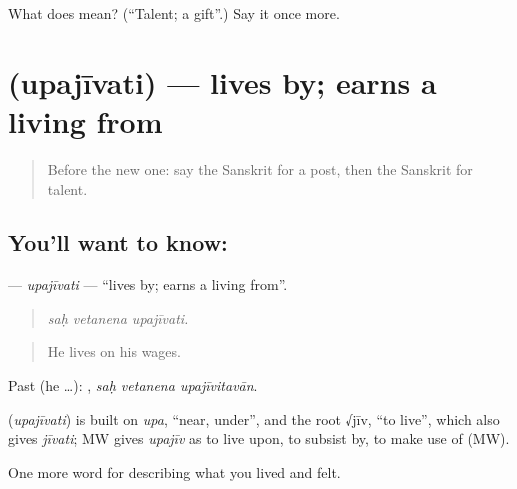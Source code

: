 \begin{tcolorbox}[breakable,colback=teal!4,colframe=teal!35!black,title={Before you move on}]
What does  mean? (\textquotedblleft{}Talent; a gift\textquotedblright{}.) Say it once more.
\end{tcolorbox}
\section[\texorpdfstring{\sk{उपजीवति} (upajīvati)}{उपजीवति (upajīvati)}]{ (upajīvati) — lives by; earns a living from}

\label{lesson:SA-C504-upajivati}



\begin{quote}
Before the new one: say the Sanskrit for a post, then the Sanskrit for talent.
\end{quote}

\subsection*{You'll want to know: }
\textbf{} — \emph{upajīvati} — \textquotedblleft{}lives by; earns a living from\textquotedblright{}.

\begin{quote}
  
\end{quote}

\begin{quote}
\emph{saḥ vetanena upajīvati.}
\end{quote}

\begin{quote}
He lives on his wages.
\end{quote}

Past (he …):   , \emph{saḥ vetanena upajīvitavān}.

\begin{cousinweb}
\textbf{} (\emph{upajīvati}) is built on \emph{upa}, \textquotedblleft{}near, under\textquotedblright{}, and the root √jīv, \textquotedblleft{}to live\textquotedblright{}, which also gives \emph{jīvati}; MW gives \emph{upajīv} as to live upon, to subsist by, to make use of (MW).
\end{cousinweb}

\begin{grammarlens}[title={What you've built}]
One more word for describing what you lived and felt.
\end{grammarlens}

